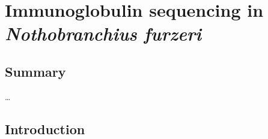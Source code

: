 
\chapter{Immunoglobulin sequencing in \textit{Nothobranchius furzeri}} 
\label{chap:igseq}
 
\onehalfspacing

\section*{Summary} 

\dots
\pagebreak


\section{Introduction}


